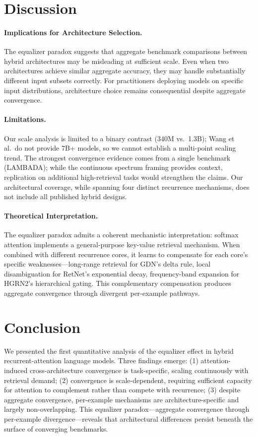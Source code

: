 \documentclass[11pt,twocolumn,a4paper]{article}
\begin{document}
\section{Discussion}

\paragraph{Implications for Architecture Selection.}
The equalizer paradox suggests that aggregate benchmark comparisons between hybrid architectures may be misleading at sufficient scale. Even when two architectures achieve similar aggregate accuracy, they may handle substantially different input subsets correctly. For practitioners deploying models on specific input distributions, architecture choice remains consequential despite aggregate convergence.

\paragraph{Limitations.}
Our scale analysis is limited to a binary contrast (340M vs.\ 1.3B); Wang et al.\ do not provide 7B+ models, so we cannot establish a multi-point scaling trend. The strongest convergence evidence comes from a single benchmark (LAMBADA); while the continuous spectrum framing provides context, replication on additional high-retrieval tasks would strengthen the claims. Our architectural coverage, while spanning four distinct recurrence mechanisms, does not include all published hybrid designs.

\paragraph{Theoretical Interpretation.}
The equalizer paradox admits a coherent mechanistic interpretation: softmax attention implements a general-purpose key-value retrieval mechanism. When combined with different recurrence cores, it learns to compensate for each core's specific weaknesses---long-range retrieval for GDN's delta rule, local disambiguation for RetNet's exponential decay, frequency-band expansion for HGRN2's hierarchical gating. This complementary compensation produces aggregate convergence through divergent per-example pathways.

\section{Conclusion}

We presented the first quantitative analysis of the equalizer effect in hybrid recurrent-attention language models. Three findings emerge: (1) attention-induced cross-architecture convergence is task-specific, scaling continuously with retrieval demand; (2) convergence is scale-dependent, requiring sufficient capacity for attention to complement rather than compete with recurrence; (3) despite aggregate convergence, per-example mechanisms are architecture-specific and largely non-overlapping. This equalizer paradox---aggregate convergence through per-example divergence---reveals that architectural differences persist beneath the surface of converging benchmarks.
\end{document}

